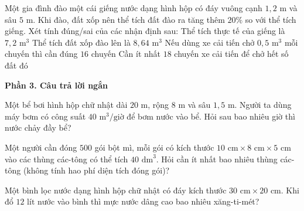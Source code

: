 \begin{ex} %
Một gia đình đào một cái giếng nước dạng hình hộp có đáy vuông cạnh $1{,}2\text{ m}$ và sâu $5\text{ m}$. Khi đào, đất xốp nên thể tích đất đào ra tăng thêm $20\%$ so với thể tích giếng. Xét tính đúng/sai của các nhận định sau:
\choiceTF
{\True Thể tích thực tế của giếng là $7{,}2\text{ m}^3$}
{\True Thể tích đất xốp đào lên là $8{,}64\text{ m}^3$}
{Nếu dùng xe cải tiến chở $0{,}5\text{ m}^3$ mỗi chuyến thì cần đúng $16$ chuyến}
{\True Cần ít nhất $18$ chuyến xe cải tiến để chở hết số đất đó}
\end{ex}

\textbf{Phần 3. Câu trả lời ngắn}

\begin{ex} %
Một bể bơi hình hộp chữ nhật dài $20\text{ m}$, rộng $8\text{ m}$ và sâu $1{,}5\text{ m}$. Người ta dùng máy bơm có công suất $40\text{ m}^3\text{/giờ}$ để bơm nước vào bể. Hỏi sau bao nhiêu giờ thì nước chảy đầy bể?
\end{ex}

\begin{ex} %
Một người cần đóng $500$ gói bột mì, mỗi gói có kích thước $10\text{ cm} \times 8\text{ cm} \times 5\text{ cm}$ vào các thùng các-tông có thể tích $40\text{ dm}^3$. Hỏi cần ít nhất bao nhiêu thùng các-tông (không tính hao phí diện tích đóng gói)?
\end{ex}

\begin{ex} %
Một bình lọc nước dạng hình hộp chữ nhật có đáy kích thước $30\text{ cm} \times 20\text{ cm}$. Khi đổ $12\text{ lít}$ nước vào bình thì mực nước dâng cao bao nhiêu xăng-ti-mét?
\end{ex}

